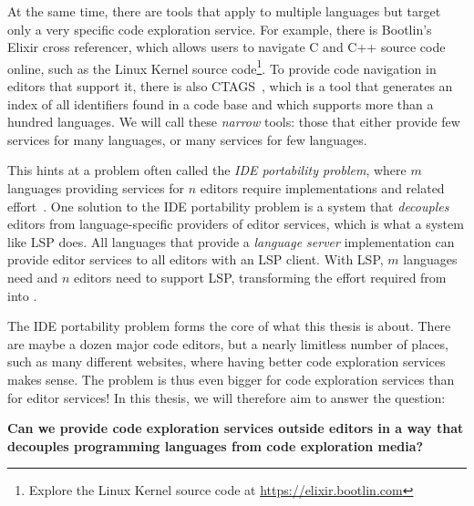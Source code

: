 At the same time, there are tools that apply to multiple languages but target only a very specific code exploration service.
For example, there is Bootlin's Elixir cross referencer,
which allows users to navigate C and C++ source code online, such as the Linux Kernel source code\footnote{Explore the Linux Kernel source code at \url{https://elixir.bootlin.com}}.
To provide code navigation in editors that support it, there is also CTAGS~\autocite{ctags}, which is a tool that generates an index of all identifiers found in a code base and which supports more than a hundred languages.
We will call these \emph{narrow} tools: those that either provide few services for many languages, or many services for few languages.

This hints at a problem often called the \emph{\ac{IDE} portability problem}, where $m$ languages providing services for $n$ editors require \problem{\times} implementations and related effort~\autocite{KeidelPE16}.
One solution to the \ac{IDE} portability problem is a system that \emph{decouples} editors from language-specific providers of editor services, which is what a system like \ac{LSP} does.
All languages that provide a \emph{language server} implementation can provide editor services to all editors with an \ac{LSP} client.
With \ac{LSP}, $m$ languages need and $n$ editors need to support \ac{LSP}, transforming the effort required from \problem{\times} into \problem{+}.



The IDE portability problem forms the core of what this thesis is about.
There are maybe a dozen major code editors, but a nearly limitless number of places, such as many different websites, where having better code exploration services makes sense.
The \problem{\times} problem is thus even bigger for code exploration services than for editor services!
In this thesis, we will therefore aim to answer the question:

\begin{center}
    \textbf{Can we provide code exploration services outside editors in a way that decouples programming languages from code exploration media?}
\end{center}

